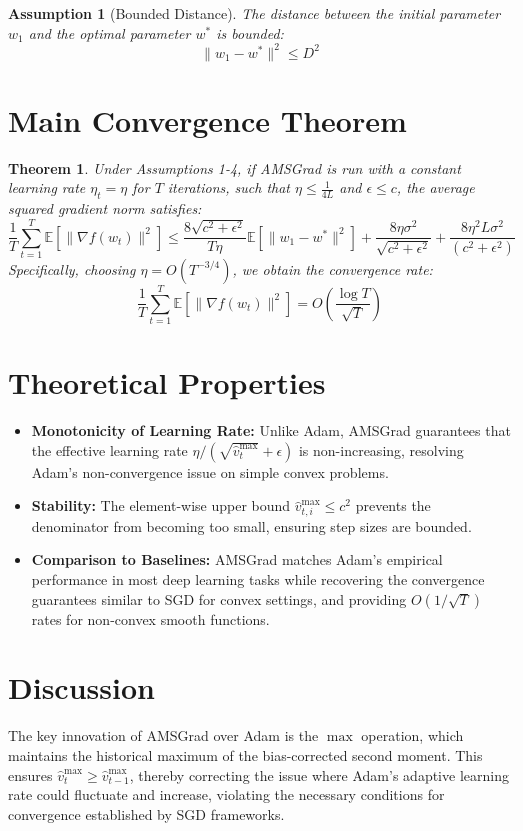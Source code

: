 \documentclass{article}
\newtheorem{theorem}{Theorem}
\newtheorem{assumption}{Assumption}
\begin{document}
\begin{assumption}[Bounded Distance]
The distance between the initial parameter $w_1$ and the optimal parameter $w^*$ is bounded:
$$ \|w_1 - w^*\|^2 \leq D^2 $$
\end{assumption}

\section*{Main Convergence Theorem}

\begin{theorem}
Under Assumptions 1-4, if AMSGrad is run with a constant learning rate $\eta_t = \eta$ for $T$ iterations, such that $\eta \leq \frac{1}{4L}$ and $\epsilon \leq c$, the average squared gradient norm satisfies:
$$ \frac{1}{T} \sum_{t=1}^T \mathbb{E}[\|\nabla f(w_t)\|^2] \leq \frac{8\sqrt{c^2+\epsilon^2}}{T \eta} \mathbb{E}[\|w_1 - w^*\|^2] + \frac{8\eta \sigma^2}{\sqrt{c^2+\epsilon^2}} + \frac{8\eta^2 L \sigma^2}{(c^2+\epsilon^2)} $$
Specifically, choosing $\eta = O(T^{-3/4})$, we obtain the convergence rate:
$$ \frac{1}{T} \sum_{t=1}^T \mathbb{E}[\|\nabla f(w_t)\|^2] = O\left(\frac{\log T}{\sqrt{T}}\right) $$
\end{theorem}

\section*{Theoretical Properties}
\begin{itemize}
\item \textbf{Monotonicity of Learning Rate:} Unlike Adam, AMSGrad guarantees that the effective learning rate $\eta / (\sqrt{\hat{v}_t^{\max}} + \epsilon)$ is non-increasing, resolving Adam's non-convergence issue on simple convex problems.
\item \textbf{Stability:} The element-wise upper bound $\hat{v}_{t,i}^{\max} \leq c^2$ prevents the denominator from becoming too small, ensuring step sizes are bounded.
\item \textbf{Comparison to Baselines:} AMSGrad matches Adam's empirical performance in most deep learning tasks while recovering the convergence guarantees similar to SGD for convex settings, and providing $O(1/\sqrt{T})$ rates for non-convex smooth functions.
\end{itemize}

\section*{Discussion}
The key innovation of AMSGrad over Adam is the $\max$ operation, which maintains the historical maximum of the bias-corrected second moment. This ensures $\hat{v}_t^{\max} \geq \hat{v}_{t-1}^{\max}$, thereby correcting the issue where Adam's adaptive learning rate could fluctuate and increase, violating the necessary conditions for convergence established by SGD frameworks.
\end{document}
